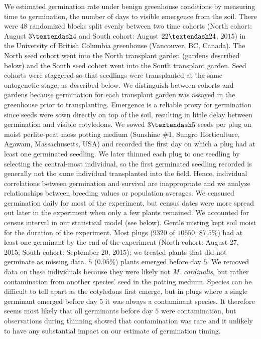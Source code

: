 \documentclass[
  12pt,
]{article}
\begin{document}
We estimated germination rate under benign greenhouse conditions by measuring time to germination, the number of days to visible emergence from the soil. There were \(48\) randomized blocks split evenly between two time cohorts (North cohort: August \(3 \textendash 4\) and South cohort: August \(22 \textendash 24\), \(2015\)) in the University of British Columbia greenhouse (Vancouver, BC, Canada). The North seed cohort went into the North transplant garden (gardens described below) and the South seed cohort went into the South transplant garden. Seed cohorts were staggered so that seedlings were transplanted at the same ontogenetic stage, as described below. We distinguish between cohorts and gardens because germination for each transplant garden was assayed in the greenhouse prior to transplanting. Emergence is a reliable proxy for germination since seeds were sown directly on top of the soil, resulting in little delay between germination and visible cotyledons. We sowed \(3 \textendash 5\) seeds per plug on moist perlite-peat moss potting medium (Sunshine \#1, Sungro Horticulture, Agawam, Massachusetts, USA) and recorded the first day on which a plug had at least one germinated seedling. We later thinned each plug to one seedling by selecting the central-most individual, so the first germinated seedling recorded is generally not the same individual transplanted into the field. Hence, individual correlations between germination and survival are inappropriate and we analyze relationships between breeding values or population averages. We censused germination daily for most of the experiment, but census dates were more spread out later in the experiment when only a few plants remained. We accounted for census interval in our statistical model (see below). Gentle misting kept soil moist for the duration of the experiment. Most plugs (\(9320\) of \(10650\), \(87.5\)\%) had at least one germinant by the end of the experiment (North cohort: August 27, 2015; South cohort: September 20, 2015); we treated plants that did not germinate as missing data. \(5\) (\(0.05\)\%) plants emerged before day \(5\). We removed data on these individuals because they were likely not \emph{M. cardinalis}, but rather contamination from another species' seed in the potting medium. Species can be difficult to tell apart as the cotyledons first emerge, but in plugs where a single germinant emerged before day \(5\) it was always a contaminant species. It therefore seems most likely that all germinants before day \(5\) were contamination, but observations during thinning showed that contamination was rare and it unlikely to have any substantial impact on our estimate of germination timing.
\end{document}
